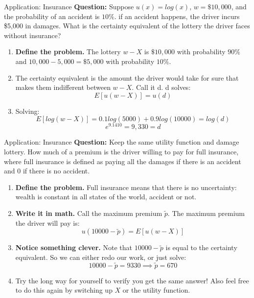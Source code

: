 \documentclass[aspectratio=169]{beamer}
\begin{document}
\begin{frame}{Application: Insurance}
\textbf{Question:} Suppose $u(x)=log(x)$, $w= \$10,000$, and the probability of an accident is $10\%$. if an accident happens, the driver incurs \$5,000 in damages. What is the certainty equivalent of the lottery the driver faces without insurance?

\begin{enumerate}
    \item \textbf{Define the problem.} The lottery $w-X$ is $\$10,000$ with probability $90\%$ and $10,000-5,000=\$5,000$ with probability $10\%$.
    \item The certainty equivalent is the amount the driver would take for sure that makes them indifferent between $w-X$. Call it d. d solves:
    \[E[u(w-X)]=u(d)\]
    \item Solving:
    \[E[log(w-X)]=0.1log(5000) + 0.9log(10000)=log(d)\]
    \[e^{9.1410}=9,330=d\]
\end{enumerate}

\end{frame}

\begin{frame}{Application: Insurance}
\textbf{Question:} Keep the same utility function and damage lottery. How much of a premium is the driver willing to pay for full insurance, where full insurance is defined as paying all the damages if there is an accident and 0 if there is no accident.

\begin{enumerate}
    \item \textbf{Define the problem.} Full insurance means that there is no uncertainty: wealth is constant in all states of the world, accident or not.
    \item \textbf{Write it in math.} Call the maximum premium $\tilde p$. The maximum premium the driver will pay is:
    \[u(10000-\tilde p)=E[u(w-X)]\]
    \item \textbf{Notice something clever.} Note that $10000-\tilde p$ is equal to the certainty equivalent. So we can either redo our work, or just solve:
    \[10000-\tilde p=9330\implies \tilde p = 670\]
    \item Try the long way for yourself to verify you get the same answer! Also feel free to do this again by switching up $X$ or the utility function.
\end{enumerate}

\end{frame}
\end{document}
